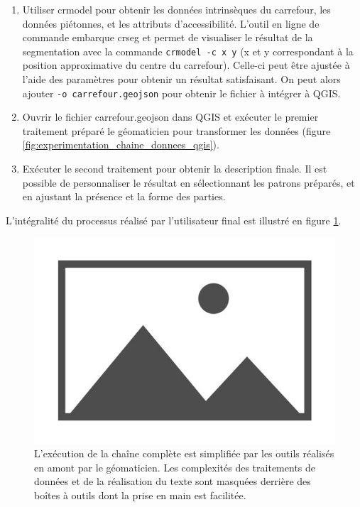 \begin{enumerate}
    \item Utiliser crmodel pour obtenir les données intrinsèques du carrefour, les données piétonnes, et les attributs d'accessibilité. L'outil en ligne de commande embarque crseg et permet de visualiser le résultat de la segmentation avec la commande \texttt{crmodel -c x y} (x et y correspondant à la position approximative du centre du carrefour). Celle-ci peut être ajustée à l'aide des paramètres pour obtenir un résultat satisfaisant. On peut alors ajouter \texttt{-o carrefour.geojson} pour obtenir le fichier à intégrer à QGIS.
    \item Ouvrir le fichier carrefour.geojson dans QGIS et exécuter le premier traitement préparé le géomaticien pour transformer les données (figure \ref{fig:experimentation_chaine_donnees_qgis}).
    \item Exécuter le second traitement pour obtenir la description finale. Il est possible de personnaliser le résultat en sélectionnant les patrons préparés, et en ajustant la présence et la forme des parties. 
\end{enumerate}

L'intégralité du processus réalisé par l'utilisateur final est illustré en figure \ref{fig:experimentation_processus_realisation_utilisateur}.

\begin{figure}[ht]
    \centering
    \includegraphics{images/placeholder.jpg}
    \caption{L'exécution de la chaîne complète est simplifiée par les outils réalisés en amont par le géomaticien. Les complexités des traitements de données et de la réalisation du texte sont masquées derrière des boîtes à outils dont la prise en main est facilitée.}
    \label{fig:experimentation_processus_realisation_utilisateur}
\end{figure}

